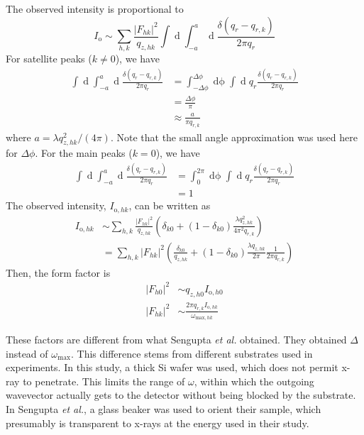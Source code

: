 \documentclass[12pt,letterpaper]{article}
\newcommand{\pars}[1]{\mathopen{}\left( #1 \right)\mathclose{}} %
\newcommand{\+}{^{\dagger}}%
\begin{document}
The observed intensity is proportional to
\begin{equation}
  I_{\mathrm{o}} \sim \sum_{h,k} \frac{\lvert F_{hk} \rvert^2}{q_{z,hk}} \int\mathop{dq_x} 
                      \int_{-a}^{a}\mathop{dq_y} \frac{\delta(q_r-q_{r,k})}{2\pi q_r}
\end{equation}
For satellite peaks ($k \neq 0$), we have 
\begin{align}
  \int\mathop{dq_x} \int_{-a}^a\mathop{dq_y} \frac{\delta(q_r-q_{r,k})}{2\pi q_r}
  &= \int_{-\Delta\phi}^{\Delta\phi}\mathop{d\phi} \int\mathop{dq_r} q_r\frac{\delta(q_r-q_{r,k})}{2\pi q_r} \\
  &= \frac{\Delta\phi}{\pi} \\
  &\approx \frac{a}{\pi q_{r,k}}
\end{align}
where $a=\lambda q_{z,hk}^2/(4\pi)$. Note that the small angle approximation was used here for $\Delta\phi$.
For the main peaks ($k=0$), we have 
\begin{align}
  \int\mathop{dq_x} \int_{-a}^a\mathop{dq_y} \frac{\delta(q_r-q_{r,k})}{2\pi q_r}
  &= \int_0^{2\pi}\mathop{d\phi} \int\mathop{dq_r} q_r\frac{\delta(q_r-q_{r,k})}{2\pi q_r} \\
  &= 1
\end{align}
The observed intensity, $I_{\mathrm{o},hk}$, can be written as
\begin{align}
  I_{\mathrm{o},hk} &\sim \sum_{h,k} \frac{|F_{hk}|^2}{q_{z,hk}}
                    \pars{\delta_{k0}+(1-\delta_{k0})\frac{\lambda q_{z,hk}^2}{4\pi^2 q_{r,k}}} \\
  &= \sum_{h,k}|F_{hk}|^2 \pars{\frac{\delta_{k0}}{q_{z,hk}}+(1-\delta_{k0})\frac{\lambda q_{z,hk}}{2\pi}
  \frac{1}{2\pi q_{r,k}}}
\end{align}
Then, the form factor is 
\begin{align}
  |F_{h0}|^2 &\sim q_{z,h0} I_{\mathrm{o},h0} \\
  |F_{hk}|^2 &\sim \frac{2\pi q_{r,k} I_{\mathrm{o},hk}}{\omega_{\mathrm{max},hk}} 
\end{align}

These factors are different from what Sengupta \textit{et al.} obtained. They
obtained $\Delta$ instead of $\omega_{\text{max}}$. This difference stems from
different substrates used in experiments. In this study, a thick Si wafer
was used, which does not permit x-ray to penetrate. This limits the range
of $\omega$, within which the outgoing wavevector actually gets to the
detector without being blocked by the substrate. In Sengupta \textit{et al.},
a glass beaker was used to orient their sample, which presumably is
transparent to x-rays at the energy used in their study. 
\end{document}
